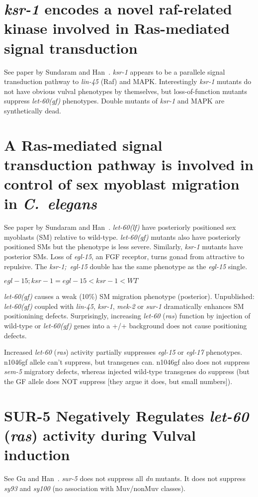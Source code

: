 \documentclass[10pt, onecolumn]{article}
\newcommand{\cel}{\emph{C.~elegans}}
\newcommand{\gene}[1]{\mbox{\emph{#1}}}
\newcommand{\ras}{\gene{let-60} (\emph{ras})}
\newcommand{\letgf}{\gene{let-60(gf)}}
\newcommand{\letlf}{\gene{let-60(lf)}}
\begin{document}
\section*{\gene{ksr-1} encodes a novel raf-related kinase involved in Ras-mediated
signal transduction}
See paper by Sundaram and Han~\cite{Sundaram1995}. \gene{ksr-1} appears to be a
parallele signal transduction pathway to \gene{lin-45} (Raf) and MAPK. Interestingly
\gene{ksr-1} mutants do not have obvious vulval phenotypes by themselves, but
loss-of-function mutants suppress \letgf{} phenotypes. Double mutants of
\gene{ksr-1} and MAPK are synthetically dead.

\section*{A Ras-mediated signal transduction pathway is involved in control of sex
myoblast migration in \cel{}}
See paper by Sundaram and Han~\cite{Sundaram1996}. \letlf{} have posteriorly
positioned sex myoblasts (SM) relative to wild-type. \letgf{} mutants also have
posteriorly positioned SMs but the phenotype is less severe. Similarly, \gene{ksr-1}
mutants have posterior SMs. Loss of \gene{egl-15}, an FGF receptor, turns gonad from
attractive to repulsive. The \gene{ksr-1; egl-15} double has the same phenotype
as the \gene{egl-15} single.

$
egl-15; ksr-1 = egl-15 < ksr-1 < WT
$

\letgf{} causes a weak (10\%) SM migration phenotype (posterior). Unpublished:
\letgf{} coupled with \gene{lin-45}, \gene{ksr-1}, \gene{mek-2} or \gene{sur-1}
dramatically enhances SM positionining defects. Surprisingly, increasing
\ras{} function by injection of wild-type or \letgf{} genes into a +/+ background
does not cause positioning defects.

Increased \ras{} activity partially suppresses \gene{egl-15} or \gene{egl-17}
phenotypes. n1046gf allele can't suppress, but transgenes can. n1046gf also does
not suppress \gene{sem-5} migratory defects, whereas injected wild-type transgenes
do suppress (but the GF allele does NOT suppress [they argue it does, but small
numbers]).


\section*{SUR-5 Negatively Regulates \ras{} activity during Vulval induction}
See Gu and Han~\cite{Gu1998}.
\gene{sur-5} does not suppress all \emph{dn} mutants. It does not suppress
\emph{sy93} and \emph{sy100} (no association with Muv/nonMuv classes).
\end{document}
